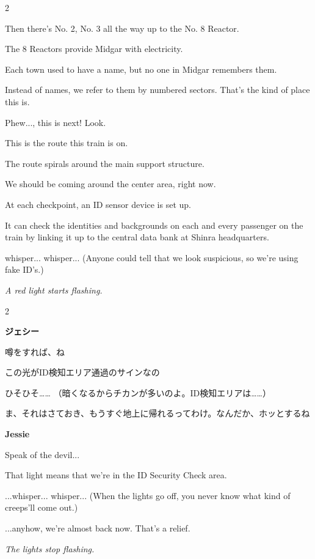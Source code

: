 \documentclass[10pt]{book}
\newcommand{\leaveSpace}{\vspace{0.0625in}}
\newcommand{\switchEnglish}{\selectlanguage{english} \switchcolumn}
\newcommand{\stageDirection}[1]{{\centering \textcolor{benred8}{\textit{#1}} \par} \leaveSpace}
\newenvironment{paracolSection}
    {\begin{paracol}{2}
    \selectlanguage{japanese}
    }
    {
    \end{paracol}
    \leaveSpace
    }
\newcommand{\JessieEng}{Jessie}
\newcommand{\JessieJap}{ジェシー}
\newcommand{\role}[1]{\noindent \textbf{#1}}
\newcommand{\roleSays}[4]
    {
    \role{#1} \par %
    #3 \par %
    \switchEnglish
    \role{#2} \par %
    #4 \par %
    \leaveSpace
    }
\newcommand{\JessieSays}[2]{\roleSays{\JessieJap}{\JessieEng}{#1}{#2}}
\begin{document}
\begin{paracolSection}
{Then there's No. 2, No. 3 all the way up to the No. 8 Reactor.

The 8 Reactors provide Midgar with electricity.

Each town used to have a name, but no one in Midgar remembers them.

Instead of names, we refer to them by numbered sectors. That's the kind of place this is.

Phew..., this is next! Look.

This is the route this train is on.

The route spirals around the main support structure.

We should be coming around the center area, right now.

At each checkpoint, an ID sensor device is set up.

It can check the identities and backgrounds on each and every passenger on the train by linking it up to the central data bank at Shinra headquarters.

whisper... whisper... (Anyone could tell that we look suspicious, so we're using fake ID's.)}

\end{paracolSection}

\stageDirection{A red light starts flashing.}

\begin{paracolSection}

\JessieSays
{噂をすれば、ね

この光がID検知エリア通過のサインなの

ひそひそ…… （暗くなるからチカンが多いのよ。ID検知エリアは……）

ま、それはさておき、もうすぐ地上に帰れるってわけ。なんだか、ホッとするね}
{Speak of the devil...

That light means that we're in the ID Security Check area.

...whisper... whisper... (When the lights go off, you never know what kind of creeps'll come out.)

...anyhow, we're almost back now. That's a relief.}

\end{paracolSection}

\stageDirection{The lights stop flashing.}
\end{document}

